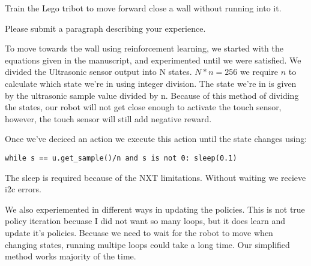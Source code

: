 \begin{center}
Train the Lego tribot to move forward close a wall without running into it.

Please submit a paragraph describing your experience.
\end{center}

To move towards the wall using reinforcement learning, we started with the equations given in the manuscript, and experimented until we were satisfied. We divided the Ultrasonic sensor output into N states. $N*n = 256$ we require $n$ to calculate which state we're in using integer division.  The state we're in is given by the ultrasonic sample value divided by n. Because of this method of dividing the states, our robot will not get close enough to activate the touch sensor, however, the touch sensor will still add negative reward.

Once we've deciced an action we execute this action until the state changes using:
\begin{verbatim}
while s == u.get_sample()/n and s is not 0: sleep(0.1)
\end{verbatim}
The sleep is required because of the NXT limitations. Without waiting we recieve i2c errors. 

We also experiemented in different ways in updating the policies. This is not true policy iteration becuase I did not want so many loops, but it does learn and update it's policies. Becuase we need to wait for the robot to move when changing states, running multipe loops could take a long time. Our simplified method works majority of the time.